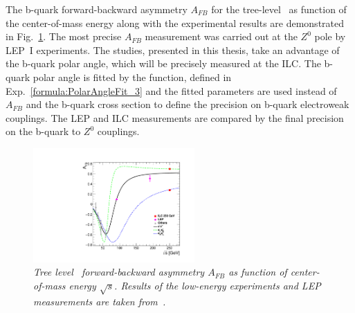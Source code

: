The b-quark forward-backward asymmetry $A_{FB}$ for the tree-level \sm\ as function of the center-of-mass energy along with the experimental results are demonstrated in Fig.~\ref{fig:LEPILC_3}. 
The most precise $A_{FB}$ measurement was carried out at the $Z^0$ pole by LEP~I experiments. 
The studies, presented in this thesis, take an advantage of the b-quark polar angle, which will be precisely measured at the ILC. 
The b-quark polar angle is fitted by the function, defined in Exp.~\ref{formula:PolarAngleFit_3} and the fitted parameters are used instead of $A_{FB}$ and the b-quark cross section to define the precision on b-quark electroweak couplings.
The LEP and ILC measurements are compared by the final precision on the b-quark to $Z^0$ couplings.%
\begin{figure}
	{\centering
		\includegraphics[width=0.55\textwidth]{ILD/plots/afb-sqrts.pdf}
		\caption{\sl Tree level \sm\ forward-backward asymmetry $A_{FB}$ as function of center-of-mass energy $\sqrt{s}$.  Results of the low-energy experiments and LEP measurements are taken from~\cite{bib:RSTOP}. 
		}
		\label{fig:LEPILC_3}
	}
	
\end{figure}

